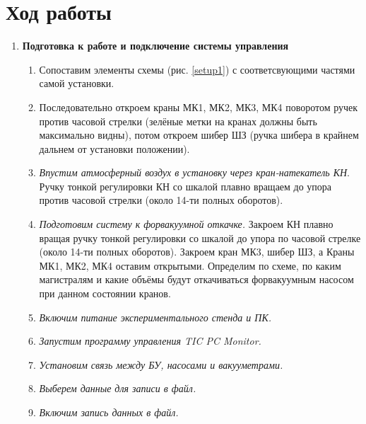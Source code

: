 \documentclass[a4paper,12pt]{article}
\begin{document}
\section{Ход работы}

\begin{enumerate}
\renewcommand{\labelenumii}{\arabic{enumii}.}

\item \textbf{Подготовка к работе и подключение системы управления }
\begin{enumerate}
	\item
	Сопоставим элементы схемы (рис. \ref{setup1}) с соответсвующими частями самой установки.
	\item
	Последовательно откроем краны МК1, МК2, МК3, МК4 поворотом ручек против часовой стрелки (зелёные метки на кранах должны быть максимально видны), потом откроем шибер ШЗ (ручка шибера в крайнем дальнем от установки положении). 
	\item
	\textit{Впустим атмосферный воздух в установку через кран-натекатель КН}. Ручку тонкой регулировки КН со шкалой плавно вращаем до упора против часовой стрелки (около 14-ти полных оборотов). 
	\item
	\textit{Подготовим систему к форвакуумной откачке.} Закроем КН плавно вращая ручку тонкой регулировки со шкалой до упора  по часовой  стрелке  (около  14-ти  полных  оборотов).  Закроем кран МК3, шибер ШЗ, а Краны МК1, МК2, МК4 оставим открытыми. Определим по схеме, по каким магистралям и какие объёмы будут откачиваться форвакуумным насосом при данном состоянии кранов. 
	\item \textit{Включим питание экспериментального стенда и ПК.} 
	\item \textit{Запустим программу управления TIC PC Monitor.}
	\item \textit{Установим связь между БУ, насосами и вакууметрами.}
	\item \textit{Выберем данные для записи в файл.}
	\item \textit{Включим запись данных в файл.}
\end{enumerate}


\end{enumerate}
\end{document}
